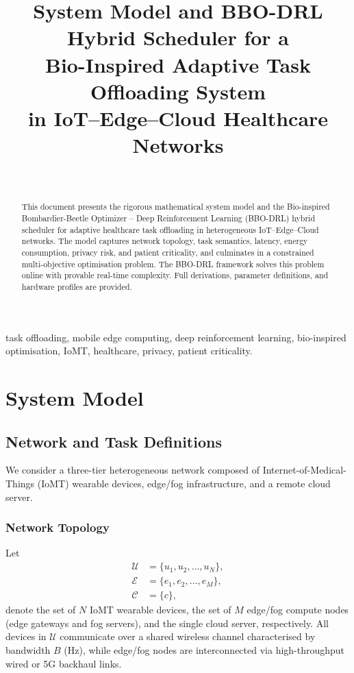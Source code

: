 \documentclass[journal,twoside,letterpaper]{IEEEtran}
\title{System Model and BBO-DRL Hybrid Scheduler for a\\
       Bio-Inspired Adaptive Task Offloading System\\
       in IoT--Edge--Cloud Healthcare Networks}
\author{%
  \IEEEauthorblockN{Author Name}\\
  \IEEEauthorblockA{Department of Electrical and Computer Engineering\\
    University of Florida, Gainesville, FL 32611, USA\\
    Email: author@ufl.edu}
}
\newcommand{\set}[1]{\mathcal{#1}}
\begin{document}
\maketitle

\begin{abstract}
This document presents the rigorous mathematical system model and the
Bio-inspired Bombardier-Beetle Optimizer -- Deep Reinforcement Learning
(BBO-DRL) hybrid scheduler for adaptive healthcare task offloading in
heterogeneous IoT--Edge--Cloud networks.  The model captures network
topology, task semantics, latency, energy consumption, privacy risk, and
patient criticality, and culminates in a constrained multi-objective
optimisation problem.  The BBO-DRL framework solves this problem online
with provable real-time complexity.  Full derivations, parameter
definitions, and hardware profiles are provided.
\end{abstract}

\begin{IEEEkeywords}
task offloading, mobile edge computing, deep reinforcement learning,
bio-inspired optimisation, IoMT, healthcare, privacy, patient criticality.
\end{IEEEkeywords}

\section{System Model}
\label{sec:system_model}

\subsection{Network and Task Definitions}
\label{subsec:network_task}

We consider a three-tier heterogeneous network composed of Internet-of-Medical-Things
(IoMT) wearable devices, edge/fog infrastructure, and a remote cloud server.

\subsubsection{Network Topology}

Let
\begin{align}
  \set{U} &= \{u_1, u_2, \ldots, u_N\}, \label{eq:set_U}\\
  \set{E} &= \{e_1, e_2, \ldots, e_M\}, \label{eq:set_E}\\
  \set{C} &= \{c\},                      \label{eq:set_C}
\end{align}
denote the set of $N$ IoMT wearable devices, the set of $M$ edge/fog compute
nodes (edge gateways and fog servers), and the single cloud server,
respectively.  All devices in $\set{U}$ communicate over a shared wireless
channel characterised by bandwidth $B$ (Hz), while edge/fog nodes are
interconnected via high-throughput wired or 5G backhaul links.
\end{document}
